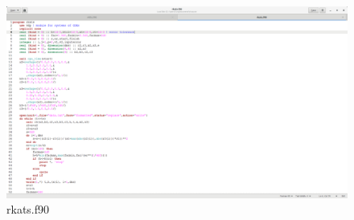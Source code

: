 \documentclass{article}
\begin{document}
	\begin{figure}[H]
		\centering	\includegraphics[width=15cm]{fig02}
		\caption{rkats.f90}
	\end{figure}
\end{document}
